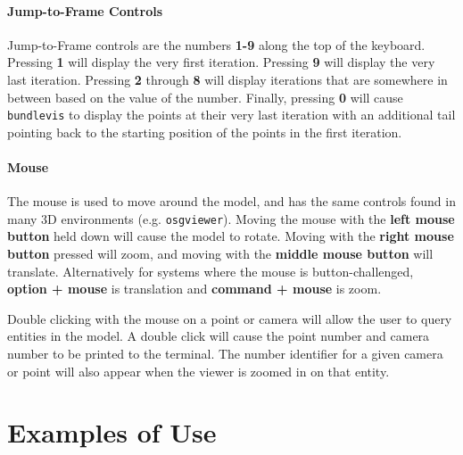 \paragraph{Jump-to-Frame Controls}
Jump-to-Frame controls are the numbers \textbf{1-9} along the top of
the keyboard. Pressing \textbf{1} will display the very first
iteration. Pressing \textbf{9} will display the very last
iteration. Pressing \textbf{2} through \textbf{8} will display
iterations that are somewhere in between based on the value of the
number. Finally, pressing \textbf{0} will cause \texttt{bundlevis} to
display the points at their very last iteration with an additional
tail pointing back to the starting position of the points in the first
iteration.

\paragraph{Mouse}
The mouse is used to move around the model, and has the same controls
found in many 3D environments (e.g. \texttt{osgviewer}). Moving the
mouse with the \textbf{left mouse button} held down will cause the
model to rotate.  Moving with the \textbf{right mouse button} pressed
will zoom, and moving with the \textbf{middle mouse button} will
translate. Alternatively for systems where the mouse is
button-challenged, \textbf{option + mouse} is translation and
\textbf{command + mouse} is zoom.

Double clicking with the mouse on a point or camera will allow the
user to query entities in the model.  A double click will cause the
point number and camera number to be printed to the terminal. The
number identifier for a given camera or point will also appear when
the viewer is zoomed in on that entity.

\section{Examples of Use}



